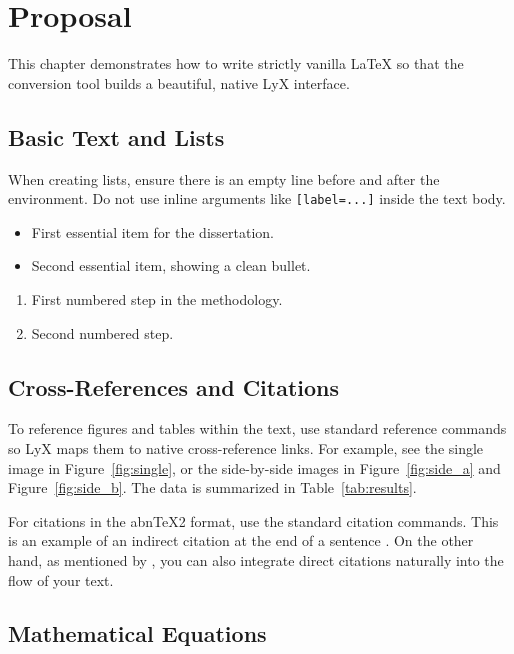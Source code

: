 \chapter{Proposal}\label{cap_proposal}

This chapter demonstrates how to write strictly vanilla LaTeX so that the conversion tool builds a beautiful, native LyX interface. 

\section{Basic Text and Lists}
\label{sec:lists}

When creating lists, ensure there is an empty line before and after the environment. Do not use inline arguments like \texttt{[label=...]} inside the text body.

\begin{itemize}
\item First essential item for the dissertation.
\item Second essential item, showing a clean bullet.
\end{itemize}

\begin{enumerate}
\item First numbered step in the methodology.
\item Second numbered step.
\end{enumerate}

\section{Cross-References and Citations}
\label{sec:cross_ref}

To reference figures and tables within the text, use standard reference commands so LyX maps them to native cross-reference links. For example, see the single image in Figure~\ref{fig:single}, or the side-by-side images in Figure~\ref{fig:side_a} and Figure~\ref{fig:side_b}. The data is summarized in Table~\ref{tab:results}.

For citations in the abnTeX2 format, use the standard citation commands. This is an example of an indirect citation at the end of a sentence \cite{araujo2012}. On the other hand, as mentioned by , you can also integrate direct citations naturally into the flow of your text.

\section{Mathematical Equations}
\label{sec:math}

